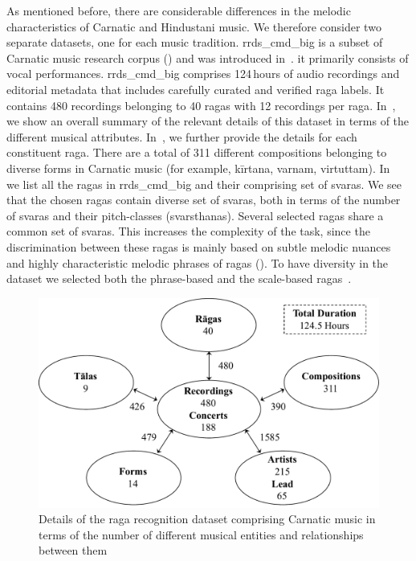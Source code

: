 {{{{ As mentioned before, there are considerable differences in the melodic characteristics of Carnatic and Hindustani music. We therefore consider two separate datasets, one for each music tradition. \acrshort{rrds_cmd_big} is a subset of Carnatic music research corpus () and was introduced in~\cite{gulatiphrase_2016}. it primarily consists of vocal performances.  \acrshort{rrds_cmd_big} comprises 124\,hours of audio recordings and editorial metadata that includes carefully curated and verified \gls{raga} labels. It contains 480 recordings belonging to 40 \glspl{raga} with 12 recordings per \gls{raga}. In~, we show an overall summary of the relevant details of this dataset in terms of the different musical attributes. In~, we  further provide the details for each constituent \gls{raga}. There are a total of 311 different compositions belonging to diverse forms in Carnatic music (for example, k\={i}rtana, varnam, virtuttam). In~ we list all the \glspl{raga} in \acrshort{rrds_cmd_big} and their comprising set of \glspl{svara}. We see that the chosen \glspl{raga} contain diverse set of \glspl{svara}, both in terms of the number of \glspl{svara} and their pitch-classes (\glspl{svarsthana}).  Several selected \glspl{raga} share a common set of \glspl{svara}. This increases the complexity of the task, since the discrimination between these \glspl{raga} is mainly based on subtle melodic nuances and highly characteristic melodic phrases of \glspl{raga} (). To have diversity in the dataset we selected both the phrase-based and the scale-based \glspl{raga}~\citep{krishna2012carnatic,meer1980hindustani}.

 \begin{figure}
 	\begin{center}
 		\includegraphics[width=\figSizeNinety]{ch04_datasets/figures/carnatic_corpus_ragaDB.pdf}
 	\end{center}
 	\caption[Details of the \gls{raga} recognition dataset comprising Carnatic music]{Details of the \gls{raga} recognition dataset comprising Carnatic music in terms of the number of different musical entities and relationships between them}
 	\label{fig:carnatic_ragaDB_details}
 \end{figure}

}}}}
